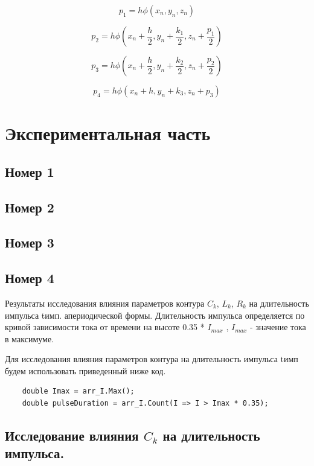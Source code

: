\documentclass[a4paper,oneside,12pt]{extreport}
\begin{document}
\begin{equation*}
    p_1 = h\phi(x_n,y_n,z_n)
\end{equation*}

\begin{equation*}
    p_2 = h\phi(x_n + \frac{h}{2},y_n+\frac{k_1}{2},z_n+\frac{p_1}{2})
\end{equation*}

\begin{equation*}
    p_3 = h\phi(x_n + \frac{h}{2},y_n+\frac{k_2}{2},z_n+\frac{p_2}{2})
\end{equation*}

\begin{equation*}
    p_4 = h\phi(x_n + h,y_n+k_3,z_n+p_3)
\end{equation*}

\section{Экспериментальная часть}


\subsection{Номер 1}
\subsection{Номер 2}
\subsection{Номер 3}

\subsection{Номер 4}

Результаты исследования влияния параметров контура
$C_k$, $L_k$, $R_k$ на длительность импульса tимп. апериодической формы.
Длительность импульса определяется по кривой зависимости тока 
от времени на высоте 0.35 *  $I_{max}$  , $I_{max}$ - значение тока в максимуме.

Для исследования влияния параметров контура на длительность импульса tимп
будем использовать приведенный ниже код.

\begin{lstlisting}
    double Imax = arr_I.Max();
    double pulseDuration = arr_I.Count(I => I > Imax * 0.35);
\end{lstlisting}

\subsection{Исследование влияния $C_k$ на длительность импульса.}
\end{document}
